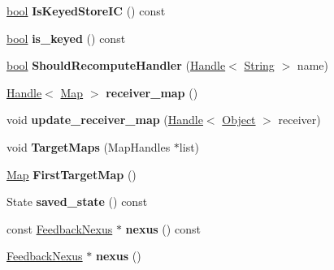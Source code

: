 \begin{DoxyCompactItemize}
\mbox{\label{classv8_1_1internal_1_1IC_adf3c27327a6acdc0e98c2748a6ee6bd1}} 
\mbox{\hyperlink{classbool}{bool}} {\bfseries Is\+Keyed\+Store\+IC} () const
\item 
\mbox{\label{classv8_1_1internal_1_1IC_a934b0dd9315b9360f2a6a321acb7d813}} 
\mbox{\hyperlink{classbool}{bool}} {\bfseries is\+\_\+keyed} () const
\item 
\mbox{\label{classv8_1_1internal_1_1IC_a176a9c8761ec424b0666029e19f5d33d}} 
\mbox{\hyperlink{classbool}{bool}} {\bfseries Should\+Recompute\+Handler} (\mbox{\hyperlink{classv8_1_1internal_1_1Handle}{Handle}}$<$ \mbox{\hyperlink{classv8_1_1internal_1_1String}{String}} $>$ name)
\item 
\mbox{\label{classv8_1_1internal_1_1IC_af8f84a82ace3a9e9bf03dba4829668c3}} 
\mbox{\hyperlink{classv8_1_1internal_1_1Handle}{Handle}}$<$ \mbox{\hyperlink{classv8_1_1internal_1_1Map}{Map}} $>$ {\bfseries receiver\+\_\+map} ()
\item 
\mbox{\label{classv8_1_1internal_1_1IC_a311e918bce9efd7bcecec44ba2bb3ee3}} 
void {\bfseries update\+\_\+receiver\+\_\+map} (\mbox{\hyperlink{classv8_1_1internal_1_1Handle}{Handle}}$<$ \mbox{\hyperlink{classv8_1_1internal_1_1Object}{Object}} $>$ receiver)
\item 
\mbox{\label{classv8_1_1internal_1_1IC_aa2b0d09aecb439940e231c09b58e7580}} 
void {\bfseries Target\+Maps} (Map\+Handles $\ast$list)
\item 
\mbox{\label{classv8_1_1internal_1_1IC_af1b022a248ae2ce8239b921ce3701b63}} 
\mbox{\hyperlink{classv8_1_1internal_1_1Map}{Map}} {\bfseries First\+Target\+Map} ()
\item 
\mbox{\label{classv8_1_1internal_1_1IC_abbf2610ef98e4c0bf0e1cd9867527d43}} 
State {\bfseries saved\+\_\+state} () const
\item 
\mbox{\label{classv8_1_1internal_1_1IC_ac10e141b7bede2f69f8af8340a90d384}} 
const \mbox{\hyperlink{classv8_1_1internal_1_1FeedbackNexus}{Feedback\+Nexus}} $\ast$ {\bfseries nexus} () const
\item 
\mbox{\label{classv8_1_1internal_1_1IC_a98079b0b4e6d8e4ab508241216ec60be}} 
\mbox{\hyperlink{classv8_1_1internal_1_1FeedbackNexus}{Feedback\+Nexus}} $\ast$ {\bfseries nexus} ()
\end{DoxyCompactItemize}
